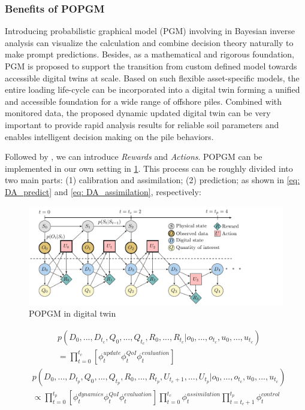 \subsubsection{Benefits of \acrlong{POPGM}}



Introducing probabilistic graphical model (\acrshort{PGM}) involving in Bayesian inverse analysis can visualize the calculation and combine decision theory naturally to make prompt predictions. Besides, as a mathematical and rigorous foundation, \acrshort{PGM} is proposed to support the transition from custom defined model towards accessible digital twins at scale. Based on such flexible asset-specific models, the entire loading life-cycle can be incorporated into a digital twin forming a unified and accessible foundation for a wide range of offshore piles. Combined with monitored data, the proposed dynamic updated digital twin can be very important to provide rapid analysis results for reliable soil parameters and enables intelligent decision making on the pile behaviors. 

 Followed by \cite{kapteyn2021}, we can introduce \textit{Rewards} and \textit{Actions}. \acrfull{POPGM} can be implemented in our own setting in \cref{fig: POMDP}. This process can be roughly divided into two main parts: (1) calibration and assimilation; (2) prediction; as shown in \cref{eq: DA_predict} and \cref{eq: DA_assimilation}, respectively:
\begin{figure}[htbp]
    \centering
    \includegraphics[width = 190mm]{Figures/figure-POMDP.pdf}
 \caption{\acrshort{POPGM} in digital twin}
 \label{fig: POMDP}
\end{figure}
\begin{equation}
\begin{aligned}
& p(D_{0},...,D_{t_{c}},Q_{0},...,Q_{t_{c}},R_{0},...,R_{t_{c}}|o_{0},...,o_{t_{c}},u_{0},...,u_{t_{c}}) \\
& = \prod_{t=0}^{t_{c}}[\phi_{t}^{update}\phi_{t}^{QoI}\phi_{t}^{evaluation}] \label{eq: DA_predict}
\end{aligned}
\end{equation}
\begin{equation}
\begin{aligned}
    & p(D_{0},...,D_{t_{p}},Q_{0},...,Q_{t_{p}},R_{0},...,R_{t_{p}},U_{t_{c}+1},...,U_{t_{p}}|o_{0},...,o_{t_{c}},u_{0},...,u_{t_{c}}) \\
    & \propto \prod_{t=0}^{t_{p}}[\phi_{t}^{dynamics}\phi_{t}^{QoI}\phi_{t}^{evaluation}] \prod_{t=0}^{t_{c}}\phi_{t}^{assimilation} \prod_{t=t_{c}+1}^{t_{p}}\phi_{t}^{control} \label{eq: DA_assimilation}
\end{aligned}
\end{equation}


